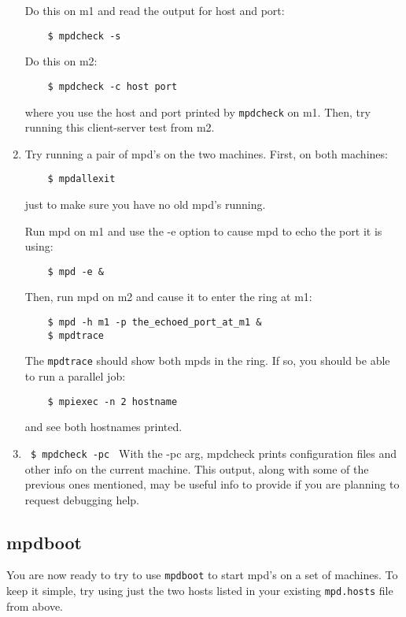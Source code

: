 \documentclass[dvipdfm,11pt]{article}
\begin{document}
\begin{enumerate}
Do this on m1 and read the output for host and port:
\begin{verbatim}
    $ mpdcheck -s
\end{verbatim}
Do this on m2:
\begin{verbatim}
    $ mpdcheck -c host port
\end{verbatim}
where you use the host and port printed by \texttt{mpdcheck} on m1.
Then, try running this client-server test from m2.

\item Try running a pair of mpd's on the two machines.  First, on both
  machines:
\begin{verbatim}
    $ mpdallexit
\end{verbatim}
just to make sure you have no old mpd's running.

Run mpd on m1 and use the -e option to cause mpd to echo
the port it is using:
\begin{verbatim}
    $ mpd -e &        
\end{verbatim}
    Then, run mpd on m2 and cause it to enter the ring at m1:
\begin{verbatim}
    $ mpd -h m1 -p the_echoed_port_at_m1 &
    $ mpdtrace
\end{verbatim}
The \texttt{mpdtrace} should show both mpds in the ring.  If so,
you should be able to run a parallel job:
\begin{verbatim}
    $ mpiexec -n 2 hostname        
\end{verbatim}
and see both hostnames printed.

\item \verb+ $ mpdcheck -pc +
With the -pc arg, mpdcheck prints configuration files and other
info on the current machine.  This output, along with some of the previous
ones mentioned, may be useful info to provide if you are planning to request
debugging help.

\end{enumerate}


\subsection{mpdboot}
\label{sec:mpdboot}

You are now ready to try to use \texttt{mpdboot} to start mpd's on a
set of machines.  To keep it simple, try using just the two
hosts listed in your existing \texttt{mpd.hosts} file from above.
\end{document}
